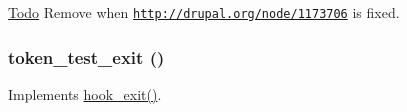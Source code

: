 \begin{Desc}
\item[\hyperlink{todo__todo000071}{Todo}]Remove when \href{http://drupal.org/node/1173706}{\tt http://drupal.org/node/1173706} is fixed. \end{Desc}
\hypertarget{token__test_8module_a7f4bb649dcba805af1772ab18eea505d}{
\subsubsection[{token\_\-test\_\-exit}]{\setlength{\rightskip}{0pt plus 5cm}token\_\-test\_\-exit ()}}
\label{token__test_8module_a7f4bb649dcba805af1772ab18eea505d}
Implements \hyperlink{group__hooks_gaab945bbc2e651510aee460dcc8691366}{hook\_\-exit()}. 